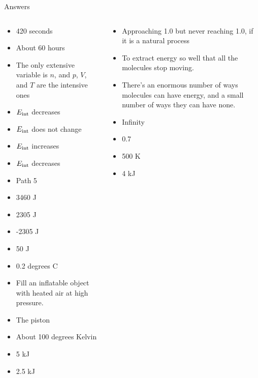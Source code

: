 \documentclass{beamer}
\begin{document}
\begin{frame}{Answers}
\tiny
\begin{columns}[T]
\begin{column}{0.5\textwidth}
\begin{itemize}
\item 420 seconds
\item About 60 hours
\item The only extensive variable is $n$, and $p$, $V$, and $T$ are the intensive ones
\item $E_{\rm int}$ decreases
\item $E_{\rm int}$ does not change
\item $E_{\rm int}$ increases
\item $E_{\rm int}$ decreases
\item Path 5
\item 3460 J
\item 2305 J
\item -2305 J
\item 50 J
\item 0.2 degrees C
\item Fill an inflatable object with heated air at high pressure.
\item The piston
\item About 100 degrees Kelvin
\item 5 kJ
\item 2.5 kJ
\end{itemize}
\end{column}
\begin{column}{0.5\textwidth}
\begin{itemize}
\item Approaching 1.0 but never reaching 1.0, if it is a natural process
\item To extract energy so well that all the molecules stop moving.
\item There's an enormous number of ways molecules can have energy, and a small number of ways they can have none.
\item Infinity
\item 0.7
\item 500 K
\item 4 kJ
\end{itemize}
\end{column}
\end{columns}
\end{frame}
\end{document}
